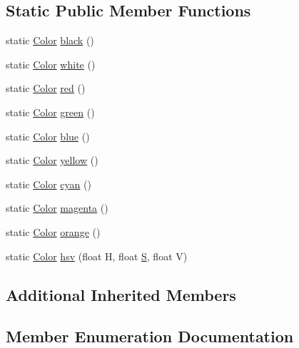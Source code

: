 \subsection*{Static Public Member Functions}
\begin{DoxyCompactItemize}
\item 
static \hyperlink{classtrimesh_1_1Color}{Color} \hyperlink{classtrimesh_1_1Color_a07940c6da47edfc63a5462b7bb2902d4}{black} ()
\item 
static \hyperlink{classtrimesh_1_1Color}{Color} \hyperlink{classtrimesh_1_1Color_ae400e9cbab4e192250e9dbb4cb2cf2dc}{white} ()
\item 
static \hyperlink{classtrimesh_1_1Color}{Color} \hyperlink{classtrimesh_1_1Color_ac56231f8718960b29323be3c966e4d11}{red} ()
\item 
static \hyperlink{classtrimesh_1_1Color}{Color} \hyperlink{classtrimesh_1_1Color_ae17448b9f7642601460d2e54e7f83905}{green} ()
\item 
static \hyperlink{classtrimesh_1_1Color}{Color} \hyperlink{classtrimesh_1_1Color_ab9bf7671a5a760af4af8259034112192}{blue} ()
\item 
static \hyperlink{classtrimesh_1_1Color}{Color} \hyperlink{classtrimesh_1_1Color_ac6156bc948dc531550cef3b86137b5b0}{yellow} ()
\item 
static \hyperlink{classtrimesh_1_1Color}{Color} \hyperlink{classtrimesh_1_1Color_a0fa734079d4c95adee86ef323267ef86}{cyan} ()
\item 
static \hyperlink{classtrimesh_1_1Color}{Color} \hyperlink{classtrimesh_1_1Color_af9fb47c4be66c136c0acce1df09c5b90}{magenta} ()
\item 
static \hyperlink{classtrimesh_1_1Color}{Color} \hyperlink{classtrimesh_1_1Color_ab5bc5d41f117a12d4a1136d7e4d99aea}{orange} ()
\item 
static \hyperlink{classtrimesh_1_1Color}{Color} \hyperlink{classtrimesh_1_1Color_a609b459d8e1ded6dd6d985ddfc0a68db}{hsv} (float H, float \hyperlink{ego_8cc_abde73cd36321648268fb4543509b996a}{S}, float V)
\end{DoxyCompactItemize}
\subsection*{Additional Inherited Members}


\subsection{Member Enumeration Documentation}
\mbox{\label{classtrimesh_1_1Color_a2e472a2f6056fb5d0d835ee1c361b6da}} 

